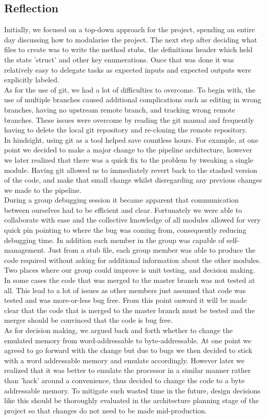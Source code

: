 \documentclass[11pt]{article}
\begin{document}
\subsection{Reflection}
Initially, we focused on a top-down approach for the project, spending an entire day discussing how to modularise the project. The next step after deciding what files to create was to write the method stubs, the definitions header which held the state 'struct' and other key enumerations. Once that was done it was relatively easy to delegate tasks as expected inputs and expected outputs were explicitly labeled.\\
As for the use of git, we had a lot of difficulties to overcome. To begin with, the use of multiple branches caused additional complications such as editing in wrong branches, having no upstream remote branch, and tracking wrong remote branches. These issues were overcome by reading the git manual and frequently having to delete the local git repository and re-cloning the remote repository. \\
In hindsight, using git as a tool helped save countless hours. For example, at one point we decided to make a major change to the pipeline architecture, however we later realized that there was a quick fix to the problem by tweaking a single module. Having git allowed us to immediately revert back to the stashed version of the code, and make that small change whilst disregarding any previous changes we made to the pipeline.\\ 
During a group debugging session it became apparent that communication between ourselves had to be efficient and clear. Fortunately we were able to collaborate with ease and the collective knowledge of all modules allowed for very quick pin pointing to where the bug was coming from, consequently reducing debugging time. In addition each member in the group was capable of self-management. Just from a stub file, each group member was able to produce the code required without asking for additional information about the other modules. \\
Two places where our group could improve is unit testing, and decision making. In some cases the code that was merged to the master branch was not tested at all. This lead to a lot of issues as other members just assumed that code was tested and was more-or-less bug free. From this point onward it will be made clear that the code that is merged to the master branch must be tested and the merger should be convinced that the code is bug free.\\
As for decision making, we argued back and forth whether to change the emulated memory from word-addressable to byte-addressable. At one point we agreed to go forward with the change but due to bugs we then decided to stick with a word addressable memory and emulate accordingly. However later we realized that it was better to emulate the processor in a similar manner rather than 'hack' around a convenience, thus decided to change the code to a byte addressable memory. To mitigate such wasted time in the future, design decisions like this should be thoroughly evaluated in the architecture planning stage of the project so that changes do not need to be made mid-production. 
\end{document}
